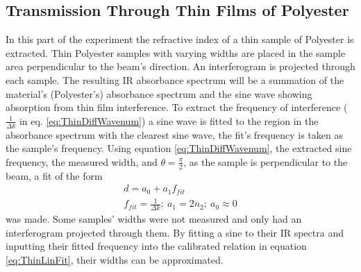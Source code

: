 \documentclass[reprint,amsmath,amssymb,aps, prl,superscriptaddress]{revtex4-2}
\begin{document}
\subsection{Transmission Through Thin Films of Polyester}
In this part of the experiment the refractive index of a thin sample of Polyester is extracted. Thin Polyester samples with varying widths are placed in the sample area perpendicular to the beam's direction. An interferogram is projected through each sample. The resulting IR absorbance spectrum will be a summation of the material's (Polyester's) absorbance spectrum and the sine wave showing absorption from thin film interference. To extract the frequency of interference ($\frac{1}{\Delta k}$ in eq. \ref{eq:ThinDiffWavenum}) a sine wave is fitted to the region in the absorbance spectrum with the clearest sine wave, the fit's frequency is taken as the sample's frequency. Using equation \ref{eq:ThinDiffWavenum}, the extracted sine frequency, the measured width, and $\theta=\frac{\pi}{2}$, as the sample is perpendicular to the beam, a fit of the form
\begin{equation}
    \begin{gathered}
        \label{eq:ThinLinFit}
        d=a_{0}+a_{1}f_{fit} \\
        f_{fit} = \frac{1}{\Delta k};\ a_1=2n_{2};\ a_0\approx 0
    \end{gathered}
\end{equation}
was made. Some samples' widths were not measured and only had an interferogram projected through them. By fitting a sine to their IR spectra and inputting their fitted frequency into the calibrated relation in equation \ref{eq:ThinLinFit}, their widths can be approximated.
\end{document}
